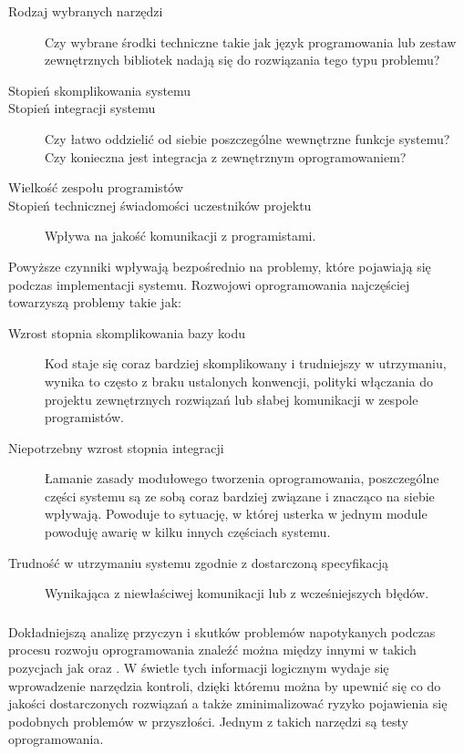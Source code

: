 	  \begin{description}
	    \item[Rodzaj wybranych narzędzi] Czy wybrane środki techniczne takie jak język programowania lub zestaw zewnętrznych bibliotek nadają się do rozwiązania tego typu problemu?
	    \item[Stopień skomplikowania systemu]
	    \item[Stopień integracji systemu] Czy łatwo oddzielić od siebie poszczególne wewnętrzne funkcje systemu? Czy konieczna jest integracja z zewnętrznym oprogramowaniem?
	    \item[Wielkość zespołu programistów]
	    \item[Stopień technicznej świadomości uczestników projektu] Wpływa na jakość komunikacji z programistami.
	  \end{description}
	  
	  Powyższe czynniki wpływają bezpośrednio na problemy, które pojawiają się podczas implementacji systemu. Rozwojowi oprogramowania najczęściej towarzyszą problemy takie jak:
	  
	  \begin{description}
  	  \item[Wzrost stopnia skomplikowania bazy kodu]
  	    Kod staje się coraz bardziej skomplikowany i trudniejszy w utrzymaniu, wynika to często z braku ustalonych konwencji, polityki włączania do projektu zewnętrznych rozwiązań lub słabej komunikacji w zespole programistów.
  	  \item[Niepotrzebny wzrost stopnia integracji]
  	    Łamanie zasady modułowego tworzenia oprogramowania, poszczególne części systemu są ze sobą coraz bardziej związane i znacząco na siebie wpływają. Powoduje to sytuację, w której usterka w jednym module powoduję awarię w kilku innych częściach systemu.
  	  \item[Trudność w utrzymaniu systemu zgodnie z dostarczoną specyfikacją]
  	    Wynikająca z niewłaściwej komunikacji lub z wcześniejszych błędów.
  	\end{description}
	
	\subsubsection{}
	Dokładniejszą analizę przyczyn i skutków problemów napotykanych podczas procesu rozwoju oprogramowania znaleźć można między innymi w takich pozycjach jak \cite{pragmatic_programmer} oraz \cite{rspec_book}.  W świetle tych informacji logicznym wydaje się wprowadzenie narzędzia kontroli, dzięki któremu można by upewnić się co do jakości dostarczonych rozwiązań a także zminimalizować ryzyko pojawienia się podobnych problemów w przyszłości. Jednym z takich narzędzi są testy oprogramowania.
	  
